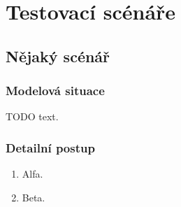 \chapter{Testovací scénáře}
\label{chap:test-scenarios}

\section{Nějaký scénář}

\subsection*{Modelová situace}

TODO text.

\subsection*{Detailní postup}

\begin{enumerate}
    \item Alfa.
    \item Beta.
\end{enumerate}
